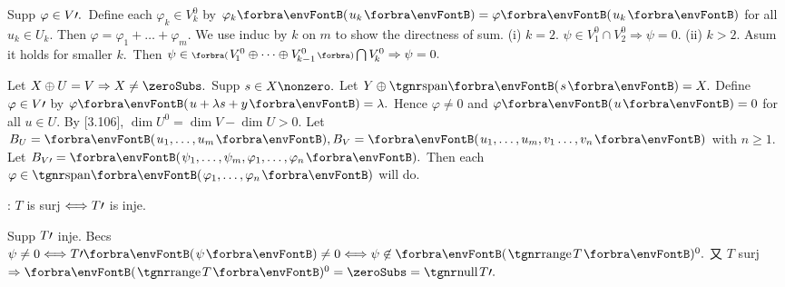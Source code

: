 \vfill{}

\vspace{4pt}

Supp $\varphi\in V\prime.$ \,Define each $\varphi_k\in V_{\!k}^0$ by $\varphi_k\Par{u_k}=\varphi\Par{u_k}$ for all $u_k\in U_k.$ Then $\varphi=\varphi_1+\dots+\varphi_m.$\vspace{2pt}\parSol{}
We use induc by $k$ on $m$ to show the directness of sum. (i) $k=2.$ $\psi\in V_{\!1}^0\cap V_{\!2}^0\Rightarrow\psi=0.$\parSol{}
(ii) $k>2.$ Asum it holds for smaller $k.$ \,Then $\psi\in\BigPar{V_{\!1}^0\oplus\cdots\oplus V_{\!{k-1}}^0}\bigcap V_{\!k}^0\Rightarrow\psi=0.$\PfEnd
\SepLine

Let $X\oplus U=V\Rightarrow X\neq\zeroSubs.$ Supp $s\in X\nonzero.$ Let $Y\oplus\Span{s}=X.$\parSol{}
Define $\varphi\in V\prime$ by $\varphi\Par{u+\lambda s+y}=\lambda.$ Hence $\varphi\neq 0$ and $\varphi\Par{u}=0$ for all $u\in U.$\PfEnd\parSol{\vspace{3pt}}
\Or {} \;By [3.106], $\dim U^0=\dim V-\dim U>0.$\parSol{}
\Blind{\Or }\Or Let $B_U=\Par{u_1,\dots,u_m},B_V=\Par{u_1,\dots,u_m,v_1\dots,v_n}$ with $n\geqslant 1.$\parSol{}
\Blind{\Or}Let $B_{V\apostrophe}=\Par{\psi_1,\dots,\psi_m,\varphi_1,\dots,\varphi_n}.$ Then each $\varphi\in\Span{\varphi_1,\dots,\varphi_n}$ will do.\PfEnd\vspace{7pt}
\ACoro {}\par
\AComm{}: $T$ is surj $\Longleftrightarrow T\prime$ is inje.\par
Supp $T\prime$ inje. Becs $\psi\neq 0\Longleftrightarrow T\apostrophe\Par{\psi}\neq 0\Longleftrightarrow\psi\not\in\Par{\range T}{^0}.$ \;又 $T$ surj $\Rightarrow\Par{\range T}{^0}=\zeroSubs=\null T\apostrophe.$\PfEnd
\SepLine

